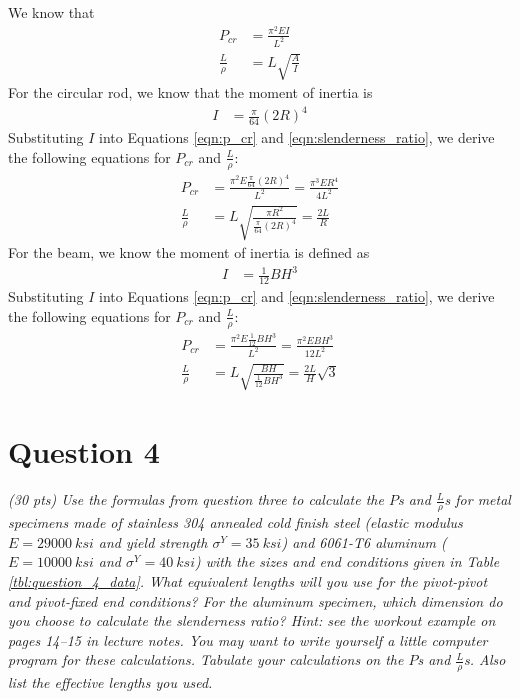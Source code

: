 \documentclass[12 pt]{article}
\begin{document}
We know that
\begin{align}
	P_{cr}&=\frac{\pi^2EI}{L^2}\label{eqn:p_cr}\\
	\frac{L}{\rho}&=L\sqrt{\frac{A}{I}}\label{eqn:slenderness_ratio}
\end{align}
For the circular rod, we know that the moment of inertia is
\begin{align*}
	I&=\frac{\pi}{64}(2R)^4
\end{align*}
Substituting $I$ into Equations \ref{eqn:p_cr} and \ref{eqn:slenderness_ratio}, we derive the following equations for $P_{cr}$ and $\frac{L}{\rho}$:
\begin{align}
	P_{cr}&=\frac{\pi^2E\frac{\pi}{64}(2R)^4}{L^2}=\frac{\pi^3ER^4}{4L^2}\label{eqn:P_cr_rod}\\
	\frac{L}{\rho}&=L\sqrt{\frac{\pi{}R^2}{\frac{\pi}{64}(2R)^4}}=\frac{2L}{R}\label{eqn:slenderness_ratio_rod}
\end{align}
For the beam, we know the moment of inertia is defined as
\begin{align*}
	I&=\frac{1}{12}BH^3
\end{align*}
Substituting $I$ into Equations \ref{eqn:p_cr} and \ref{eqn:slenderness_ratio}, we derive the following equations for $P_{cr}$ and $\frac{L}{\rho}$:
\begin{align}
	P_{cr}&=\frac{\pi^2E\frac{1}{12}BH^3}{L^2}=\frac{\pi^2EBH^3}{12L^2}\label{eqn:P_cr_beam}\\
	\frac{L}{\rho}&=L\sqrt{\frac{BH}{\frac{1}{12}BH^3}}=\frac{2L}{H}\sqrt{3}\label{eqn:slenderness_ratio_beam}
\end{align}

\section*{Question 4}
\textit{(\num{30} pts) Use the formulas from question three to calculate the $P$s and $\frac{L}{\rho}$s for metal specimens made of stainless 304 annealed cold finish steel (elastic modulus $E=\qty{29000}{ksi}$ and yield strength $\sigma^Y=\qty{35}{ksi}$) and 6061-T6 aluminum ($E=\qty{10000}{ksi}$ and $\sigma^Y=\qty{40}{ksi}$) with the sizes and end conditions given in Table \ref{tbl:question_4_data}. What equivalent lengths will you use for the pivot-pivot and pivot-fixed end conditions? For the  aluminum specimen, which dimension do you choose to calculate the slenderness ratio? Hint: see the workout example on pages \numrange{14}{15} in lecture notes. You may want to write yourself a little computer program for these calculations. Tabulate your calculations on the $P$s and $\frac{L}{\rho}$s. Also list the effective lengths you used.}
\end{document}
